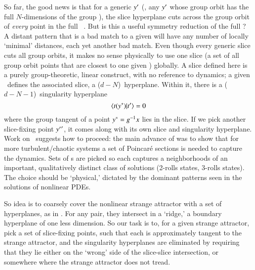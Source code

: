 


So far, the good news is that for a generic {\template} ${y'}$ (\ie,
any ${y'}$ whose group orbit has the full $N$-dimensions of the group
\Group), the slice hyperplane  cuts across the group orbit
of {\em every} point in the full \statesp\ \pS. But is this a useful
symmetry reduction of the full \statesp? A distant pattern that is a bad match
to a given {\template} will have any number of locally `minimal'
distances, each yet another bad match.
Even though every generic slice cuts all group orbits, it makes no sense
physically to use one slice (a set of all group orbit points that are
closest to one given {\template}) globally.
A slice
defined here is a purely group-theoretic, linear construct, with no
reference to dynamics; a given {\template} \slicep\ defines the
associated slice, a ($d\!-\!N$)\dmn\ hyperplane. Within it, there is a
($d\!-\!N\!-1$)\dmn\ singularity hyperplane
\[
\braket{\groupTan(\sspSing)}{\sliceTan{}}=0
\]
where the group tangent of a point $y^*=g^{-1} x$ lies in
the slice. If we pick another slice-fixing point ${y'}'$, it comes
along with its own slice and singularity hyperplane.
Work on \KS\ suggests how to
proceed: the main advance of  was to show that for more
turbulent/chaotic systems a set of Poincar\'e sections is needed to
capture the dynamics. Sets of {\PoincSec}s are picked so each captures a
neighborhoods of an important, qualitatively distinct class of solutions
(2-rolls states, 3-rolls states). The choice should be `physical,'
dictated by the dominant patterns seen in the solutions of nonlinear
PDEs.

So idea is to
coarsely cover the nonlinear strange attractor with a set of hyperplanes,
as in . For any pair, they intersect in a
`ridge,' a
boundary hyperplane of one less dimension. So our task is to, for a
given strange attractor, pick a set of slice-fixing points, such that
each is approximately tangent to the strange attractor, and the
singularity hyperplanes are eliminated by requiring that they lie either
on the `wrong' side of the slice-slice intersection, or somewhere where
the strange attractor does not tread.

